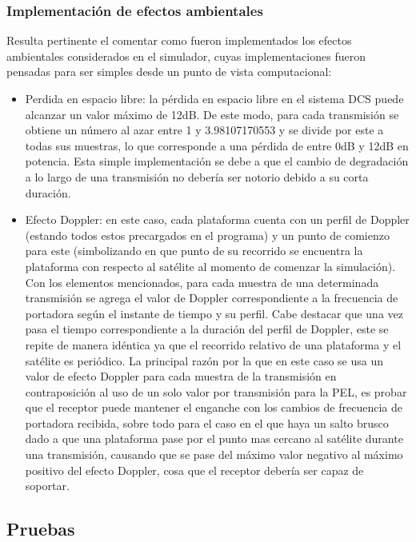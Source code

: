 \documentclass[a4paper,10pt]{article}
\begin{document}
\subsubsection{Implementación de efectos ambientales}
Resulta pertinente el comentar como fueron implementados los efectos ambientales considerados en el simulador, cuyas implementaciones fueron pensadas para ser simples desde un punto de vista computacional:
\begin{itemize}
\item Perdida en espacio libre: la pérdida en espacio libre en el sistema DCS puede alcanzar un valor máximo de 12dB. De este modo, para cada transmisión se obtiene un número al azar entre 1 y 3.98107170553 y se divide por este a todas sus muestras, lo que corresponde a una pérdida de entre 0dB y 12dB en potencia. Esta simple implementación se debe a que el cambio de degradación a lo largo de una transmisión no debería ser notorio debido a su corta duración.
\item Efecto Doppler: en este caso, cada plataforma cuenta con un perfil de Doppler (estando todos estos precargados en el programa) y un punto de comienzo para este (simbolizando en que punto de su recorrido se encuentra la plataforma con respecto al satélite al momento de comenzar la simulación). Con los elementos mencionados, para cada muestra de una determinada transmisión se agrega el valor de Doppler correspondiente a la frecuencia de portadora según el instante de tiempo y su perfil. Cabe destacar que una vez pasa el tiempo correspondiente a la duración del perfil de Doppler, este se repite de manera idéntica ya que el recorrido relativo de una plataforma y el satélite es periódico. La principal razón por la que en este caso se usa un valor de efecto Doppler para cada muestra de la transmisión en contraposición al uso de un solo valor por transmisión para la PEL, es probar que el receptor puede mantener el enganche con los cambios de frecuencia de portadora recibida,  sobre todo para el caso en el que haya un salto brusco dado a que una plataforma pase por el punto mas cercano al satélite durante una transmisión, causando que se pase del máximo valor negativo al máximo positivo del efecto Doppler, cosa que el receptor debería ser capaz de soportar.
\end{itemize}

\subsection{Pruebas}
\end{document}
